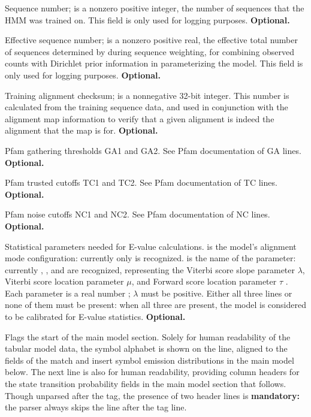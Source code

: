 \begin{wideitem}
\item [\emprog{NSEQ  <d>}] Sequence number;  is a nonzero
positive integer, the number of sequences that the HMM was trained on.
This field is only used for logging purposes.
\textbf{Optional.}

\item [\emprog{EFFN <f>}] Effective sequence number;  is a
nonzero positive real, the effective total number of sequences
determined by  during sequence weighting, for combining
observed counts with Dirichlet prior information in parameterizing the
model. This field is only used for logging purposes.
\textbf{Optional.}

\item [\emprog{CKSUM <d>}] Training alignment checksum;  is
a nonnegative 32-bit integer. This number is calculated from the
training sequence data, and used in conjunction with the alignment map
information to verify that a given alignment is indeed the alignment
that the map is for. \textbf{Optional.}

\item [\emprog{GA    <f> <f>}] Pfam gathering thresholds GA1 and GA2.
See Pfam documentation of GA lines. \textbf{Optional.}

\item [\emprog{TC <f> <f>}] Pfam trusted cutoffs TC1 and TC2.  See
Pfam documentation of TC lines. \textbf{Optional.}

\item [\emprog{NC <f> <f>}] Pfam noise cutoffs NC1 and NC2.  See Pfam
documentation of NC lines. \textbf{Optional.}

\item [\emprog{STATS <s1> <s2> <f>}] Statistical parameters needed for
E-value calculations.  is the model's alignment mode
configuration: currently only  is recognized. 
is the name of the parameter: currently , ,
and  are recognized, representing the Viterbi score slope
parameter $\lambda$, Viterbi score location parameter $\mu$, and
Forward score location parameter $\tau$ \citep{Eddy08}. Each parameter
is a real number ; $\lambda$ must be positive. Either all
three lines or none of them must be present: when all three are
present, the model is considered to be calibrated for E-value
statistics. \textbf{Optional.}

\item [\emprog{HMM }] Flags the start of the main model
section. Solely for human readability of the tabular model data, the
symbol alphabet is shown on the  line, aligned to the fields
of the match and insert symbol emission distributions in the main
model below. The next line is also for human readability, providing
column headers for the state transition probability fields in the main
model section that follows. Though unparsed after the  tag,
the presence of two header lines is \textbf{mandatory:} the parser
always skips the line after the  tag line.


\end{wideitem}
